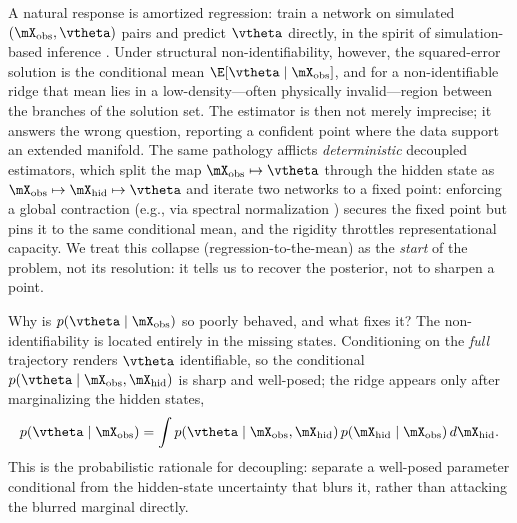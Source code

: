 \documentclass{article} %
\begin{document}
A natural response is amortized regression: train a network on simulated $(\mX_{\mathrm{obs}}, \vtheta)$ pairs and predict $\vtheta$ directly, in the spirit of simulation-based inference \citep{cranmer2020frontier}. Under structural non-identifiability, however, the squared-error solution is the conditional mean $\E[\vtheta \mid \mX_{\mathrm{obs}}]$, and for a non-identifiable ridge that mean lies in a low-density---often physically invalid---region between the branches of the solution set. The estimator is then not merely imprecise; it answers the wrong question, reporting a confident point where the data support an extended manifold. The same pathology afflicts \emph{deterministic} decoupled estimators, which split the map $\mX_{\mathrm{obs}} \mapsto \vtheta$ through the hidden state as $\mX_{\mathrm{obs}} \mapsto \mX_{\mathrm{hid}} \mapsto \vtheta$ and iterate two networks to a fixed point: enforcing a global contraction (e.g., via spectral normalization \citep{miyato2018spectral}) secures the fixed point but pins it to the same conditional mean, and the rigidity throttles representational capacity. We treat this collapse (regression-to-the-mean) as the \emph{start} of the problem, not its resolution: it tells us to recover the posterior, not to sharpen a point.

Why is $p(\vtheta \mid \mX_{\mathrm{obs}})$ so poorly behaved, and what fixes it? The non-identifiability is located entirely in the missing states. Conditioning on the \emph{full} trajectory renders $\vtheta$ identifiable, so the conditional $p(\vtheta \mid \mX_{\mathrm{obs}}, \mX_{\mathrm{hid}})$ is sharp and well-posed; the ridge appears only after marginalizing the hidden states,
\begin{equation}
\label{eq:mixture}
    p(\vtheta \mid \mX_{\mathrm{obs}}) = \int p(\vtheta \mid \mX_{\mathrm{obs}}, \mX_{\mathrm{hid}})\, p(\mX_{\mathrm{hid}} \mid \mX_{\mathrm{obs}})\, d\mX_{\mathrm{hid}} .
\end{equation}
This is the probabilistic rationale for decoupling: separate a well-posed parameter conditional from the hidden-state uncertainty that blurs it, rather than attacking the blurred marginal directly.
\end{document}
